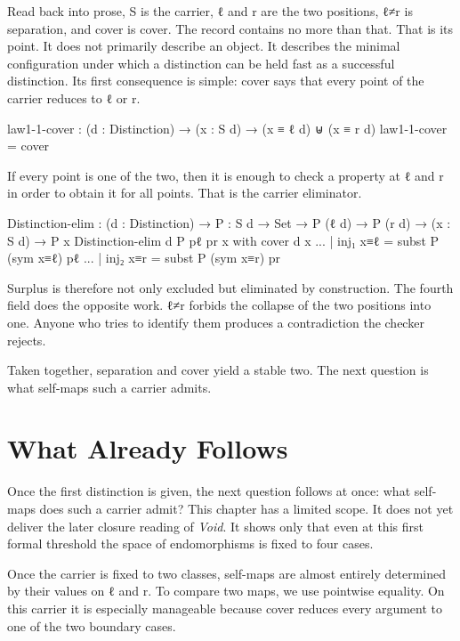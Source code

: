 \documentclass[11pt,a4paper]{book}
\def\texttt#1{#1}%
\begin{document}
Read back into prose, \texttt{S} is the carrier, \texttt{ℓ} and
\texttt{r} are the two positions, \texttt{ℓ≠r} is separation, and
\texttt{cover} is cover. The record contains no more than that. That is
its point. It does not primarily describe an object. It describes the
minimal configuration under which a distinction can be held fast as a
successful distinction. Its first consequence is simple: \texttt{cover}
says that every point of the carrier reduces to \texttt{ℓ} or \texttt{r}.

\begin{code}
law1-1-cover : (d : Distinction) → (x : S d) → (x ≡ ℓ d) ⊎ (x ≡ r d)
law1-1-cover = cover
\end{code}

If every point is one of the two, then it is enough to check a property at
\texttt{ℓ} and \texttt{r} in order to obtain it for all points. That is
the carrier eliminator.

\begin{code}
Distinction-elim :
  (d : Distinction) →
  {P : S d → Set} →
  P (ℓ d) →
  P (r d) →
  (x : S d) →
  P x
Distinction-elim d {P} pℓ pr x with cover d x
... | inj₁ x≡ℓ = subst P (sym x≡ℓ) pℓ
... | inj₂ x≡r = subst P (sym x≡r) pr
\end{code}

Surplus is therefore not only excluded but eliminated by construction. The
fourth field does the opposite work. \texttt{ℓ≠r} forbids the collapse of
the two positions into one. Anyone who tries to identify them produces a
contradiction the checker rejects.

Taken together, separation and cover yield a stable two. The next question
is what self-maps such a carrier admits.

\chapter{What Already Follows}
\label{ch:endomorphisms-closure}

Once the first distinction is given, the next question follows at once:
what self-maps does such a carrier admit? This chapter has a limited scope.
It does not yet deliver the later closure reading of \textit{Void}. It shows
only that even at this first formal threshold the space of endomorphisms is
fixed to four cases.

Once the carrier is fixed to two classes, self-maps are almost entirely
determined by their values on \texttt{ℓ} and \texttt{r}. To compare two
maps, we use pointwise equality. On this carrier it is especially
manageable because \texttt{cover} reduces every argument to one of the two
boundary cases.
\end{document}
